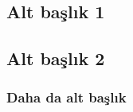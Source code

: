
\subsection{Alt başlık 1}


\lipsum[4-5]

\subsection{Alt başlık 2}


\lipsum[6-7]

\subsubsection{Daha da alt başlık }

\lipsum[8-9]
